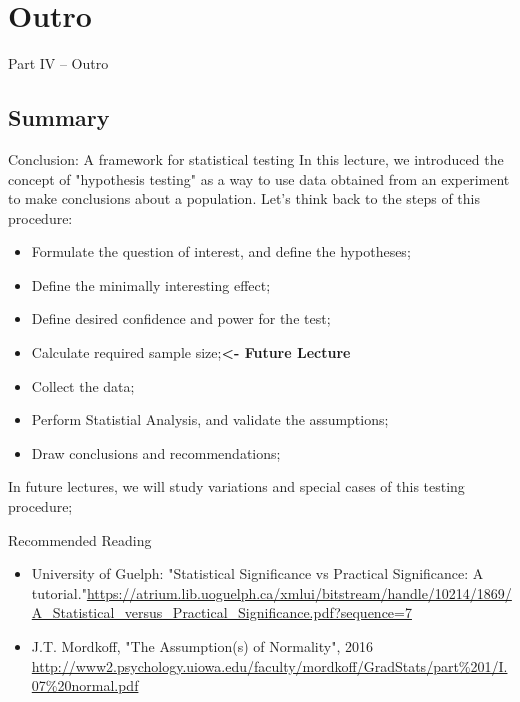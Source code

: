 \section{Outro}

\begin{frame}
  \begin{center}
    Part IV -- Outro
  \end{center}
\end{frame}

\subsection{Summary}

\begin{frame}{Conclusion: A framework for statistical testing}
  In this lecture, we introduced the concept of "hypothesis testing" as a way to use data obtained from an experiment to make conclusions about a population. Let's think back to the steps of this procedure:
  \bigskip

  \begin{itemize}
    \item Formulate the question of interest, and define the hypotheses;
    \item Define the minimally interesting effect;
    \item Define desired confidence and power for the test;
    \item Calculate required sample size;\hfill {\bf <- Future Lecture}
    \item Collect the data;
    \item Perform Statistial Analysis, and validate the assumptions;
    \item Draw conclusions and recommendations;
  \end{itemize}
  \bigskip

  In future lectures, we will study variations and special cases of this testing procedure;
\end{frame}

\begin{frame}{Recommended Reading}

  \begin{itemize}
    \item University of Guelph: "Statistical Significance vs Practical Significance: A tutorial."\url{https://atrium.lib.uoguelph.ca/xmlui/bitstream/handle/10214/1869/A_Statistical_versus_Practical_Significance.pdf?sequence=7}

    \item J.T. Mordkoff, "The Assumption(s) of Normality", 2016 \url{http://www2.psychology.uiowa.edu/faculty/mordkoff/GradStats/part\%201/I.07\%20normal.pdf}
  \end{itemize}

\end{frame}



